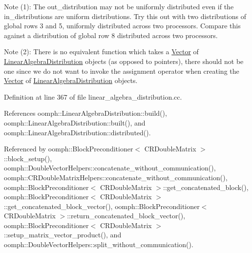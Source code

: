 Note (1)\+: The out\+\_\+distribution may not be uniformly distributed even if the in\+\_\+distributions are uniform distributions. Try this out with two distributions of global rows 3 and 5, uniformly distributed across two processors. Compare this against a distribution of global row 8 distributed across two processors.

Note (2)\+: There is no equivalent function which takes a \hyperlink{classoomph_1_1Vector}{Vector} of \hyperlink{classoomph_1_1LinearAlgebraDistribution}{Linear\+Algebra\+Distribution} objects (as opposed to pointers), there should not be one since we do not want to invoke the assignment operator when creating the \hyperlink{classoomph_1_1Vector}{Vector} of \hyperlink{classoomph_1_1LinearAlgebraDistribution}{Linear\+Algebra\+Distribution} objects. 

Definition at line 367 of file linear\+\_\+algebra\+\_\+distribution.\+cc.



References oomph\+::\+Linear\+Algebra\+Distribution\+::build(), oomph\+::\+Linear\+Algebra\+Distribution\+::built(), and oomph\+::\+Linear\+Algebra\+Distribution\+::distributed().



Referenced by oomph\+::\+Block\+Preconditioner$<$ C\+R\+Double\+Matrix $>$\+::block\+\_\+setup(), oomph\+::\+Double\+Vector\+Helpers\+::concatenate\+\_\+without\+\_\+communication(), oomph\+::\+C\+R\+Double\+Matrix\+Helpers\+::concatenate\+\_\+without\+\_\+communication(), oomph\+::\+Block\+Preconditioner$<$ C\+R\+Double\+Matrix $>$\+::get\+\_\+concatenated\+\_\+block(), oomph\+::\+Block\+Preconditioner$<$ C\+R\+Double\+Matrix $>$\+::get\+\_\+concatenated\+\_\+block\+\_\+vector(), oomph\+::\+Block\+Preconditioner$<$ C\+R\+Double\+Matrix $>$\+::return\+\_\+concatenated\+\_\+block\+\_\+vector(), oomph\+::\+Block\+Preconditioner$<$ C\+R\+Double\+Matrix $>$\+::setup\+\_\+matrix\+\_\+vector\+\_\+product(), and oomph\+::\+Double\+Vector\+Helpers\+::split\+\_\+without\+\_\+communication().

